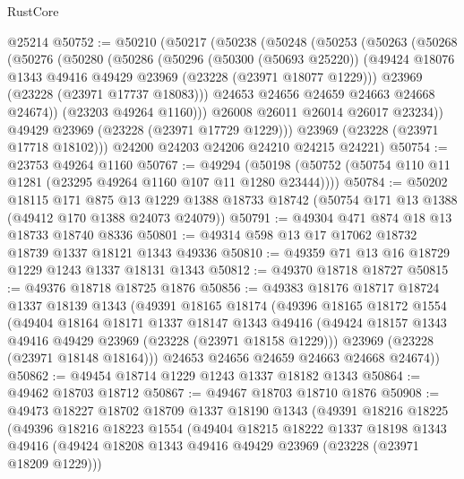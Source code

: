 \begin{lexlean}{RustCore}
\begin{coremodule}
    @25214
@50752 := @50210
    (@50217
      (@50238
        (@50248
          (@50253
            (@50263
              (@50268
                (@50276
                  (@50280
                    (@50286
                      (@50296
                        (@50300 (@50693 @25220))
                        (@49424 @18076 @1343 @49416 @49429 @23969 (@23228 (@23971 @18077 @1229)))
                        @23969
                        (@23228 (@23971 @17737 @18083)))
                      @24653
                      @24656
                      @24659
                      @24663
                      @24668
                      @24674))
                  (@23203 @49264 @1160)))
              @26008
              @26011
              @26014
              @26017
              @23234))
          @49429
          @23969
          (@23228 (@23971 @17729 @1229)))
        @23969
        (@23228 (@23971 @17718 @18102)))
      @24200
      @24203
      @24206
      @24210
      @24215
      @24221)
@50754 := @23753 @49264 @1160
@50767 := @49294
    (@50198 (@50752 (@50754 @110 @11 @1281 (@23295 @49264 @1160 @107 @11 @1280 @23444))))
@50784 := @50202
    @18115
    @171
    @875
    @13
    @1229
    @1388
    @18733
    @18742
    (@50754 @171 @13 @1388 (@49412 @170 @1388 @24073 @24079))
@50791 := @49304 @471 @874 @18 @13 @18733 @18740 @8336
@50801 := @49314 @598 @13 @17 @17062 @18732 @18739 @1337 @18121 @1343 @49336
@50810 := @49359 @71 @13 @16 @18729 @1229 @1243 @1337 @18131 @1343
@50812 := @49370 @18718 @18727
@50815 := @49376 @18718 @18725 @1876
@50856 := @49383
    @18176
    @18717
    @18724
    @1337
    @18139
    @1343
    (@49391
      @18165
      @18174
      (@49396
        @18165
        @18172
        @1554
        (@49404
          @18164
          @18171
          @1337
          @18147
          @1343
          @49416
          (@49424 @18157 @1343 @49416 @49429 @23969 (@23228 (@23971 @18158 @1229)))
          @23969
          (@23228 (@23971 @18148 @18164)))
        @24653
        @24656
        @24659
        @24663
        @24668
        @24674))
@50862 := @49454 @18714 @1229 @1243 @1337 @18182 @1343
@50864 := @49462 @18703 @18712
@50867 := @49467 @18703 @18710 @1876
@50908 := @49473
    @18227
    @18702
    @18709
    @1337
    @18190
    @1343
    (@49391
      @18216
      @18225
      (@49396
        @18216
        @18223
        @1554
        (@49404
          @18215
          @18222
          @1337
          @18198
          @1343
          @49416
          (@49424 @18208 @1343 @49416 @49429 @23969 (@23228 (@23971 @18209 @1229)))

\end{coremodule}
\end{lexlean}
